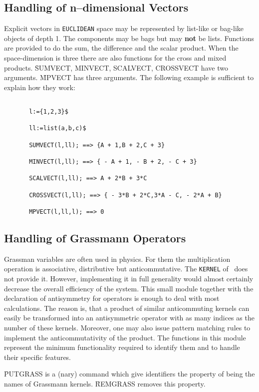 \subsection{Handling of n--dimensional Vectors}
Explicit vectors in {\tt EUCLIDEAN} space may be represented by
list-like or bag-like objects of depth 1.
The components may be bags but may {\bf not} be lists.
Functions are provided to do the sum, the difference and the
scalar product. When the space-dimension is three there are also functions
for the cross and mixed products.
\f{SUMVECT, MINVECT, SCALVECT, CROSSVECT} have two arguments.
\f{MPVECT} has three arguments. The following example
is sufficient to explain how they work:
\begin{verbatim}

       l:={1,2,3}$

       ll:=list(a,b,c)$

       SUMVECT(l,ll); ==> {A + 1,B + 2,C + 3}

       MINVECT(l,ll); ==> { - A + 1, - B + 2, - C + 3}

       SCALVECT(l,ll); ==> A + 2*B + 3*C

       CROSSVECT(l,ll); ==> { - 3*B + 2*C,3*A - C, - 2*A + B}

       MPVECT(l,ll,l); ==> 0

\end{verbatim}
\subsection{Handling of Grassmann Operators}
Grassman variables are often used in physics. For them the multiplication
operation is associative, distributive but anticommutative. The
{\tt KERNEL} of \REDUCE\ does not provide it. However, implementing
it in full generality would almost
certainly decrease the overall efficiency of the system. This small
module together with the declaration of antisymmetry for operators is
enough to deal with most calculations. The reason is, that a
product of similar anticommuting kernels can easily  be transformed
into an antisymmetric operator with as many indices as the number of
these kernels. Moreover, one may also issue pattern matching rules
to implement the anticommutativity of the product.
The functions in this module represent the minimum functionality
required to identify them and to handle their specific features.

\f{PUTGRASS} is a (nary) command which give identifiers the property
of being the names of Grassmann kernels. \f{REMGRASS} removes this property.

